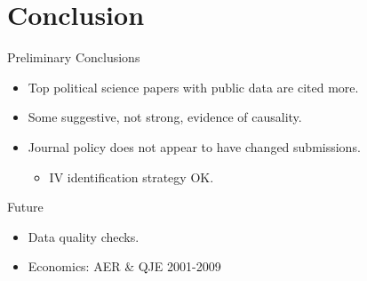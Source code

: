 \documentclass{beamer}
\begin{document}
{ %
    \begin{frame}[plain]
     \end{frame}
}

{ %
    \begin{frame}[plain]
     \end{frame}
}

\begin{frame}{}
\scalebox{0.60}{}
\end{frame}

\section{Conclusion}

\begin{frame}{Preliminary Conclusions}

  \begin{itemize}
  \item
    Top political science papers with public data are cited more.
  \item
    Some suggestive, not strong, evidence of causality.
  \item
    Journal policy does not appear to have changed submissions.
    \begin{itemize}
    \item IV identification strategy OK.
    \end{itemize}
  \end{itemize}
\end{frame}

\begin{frame}{Future}
	\begin{itemize}
	\item Data quality checks.
	\item Economics: AER \& QJE 2001-2009
	\end{itemize}
\end{frame}
\end{document}
